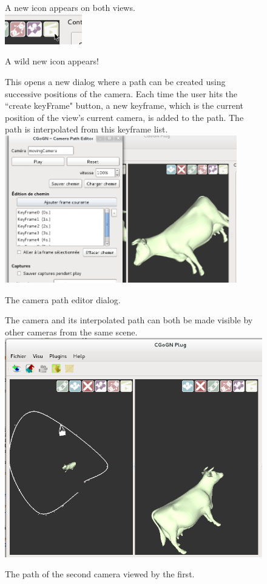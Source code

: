 \documentclass[a4paper]{scrreprt}
\begin{document}
	\begin{figure}[h!p]
		A new icon appears on both views.\\
		\centering
		\includegraphics[width=0.3\textwidth]{images/screenshot22}
		\caption{A wild new icon appears!}		
	\end{figure}
	\begin{figure}[h!p]
		This opens a new dialog where a path can be created using successive
		positions of the camera. Each time the user hits the ``create keyFrame"
		button, a new keyframe, which is the current position of the view's current
		camera, is added to the path. The path is interpolated from this keyframe
		list.\\
		\centering
		\includegraphics[width=0.9\textwidth]{images/screenshot23}
		\caption{The camera path editor dialog.}		
	\end{figure}
	\begin{figure}[h!p]
		The camera and its interpolated path can both be made visible by other
		cameras from the same scene.\\
		\centering
		\includegraphics[width=1\textwidth]{images/screenshot24}
		\caption{The path of the second camera viewed by the first.}		
	\end{figure}
	
\end{document}
